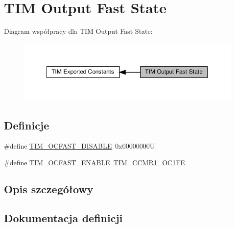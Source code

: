\hypertarget{group___t_i_m___output___fast___state}{}\section{T\+IM Output Fast State}
\label{group___t_i_m___output___fast___state}
Diagram współpracy dla T\+IM Output Fast State\+:\nopagebreak
\begin{figure}[H]
\begin{center}
\leavevmode
\includegraphics[width=350pt]{group___t_i_m___output___fast___state}
\end{center}
\end{figure}
\subsection*{Definicje}
\begin{DoxyCompactItemize}
\item 
\#define \hyperlink{group___t_i_m___output___fast___state_ga71429b63f2a6604171ccfd3a91ccf43a}{T\+I\+M\+\_\+\+O\+C\+F\+A\+S\+T\+\_\+\+D\+I\+S\+A\+B\+LE}~0x00000000U
\item 
\#define \hyperlink{group___t_i_m___output___fast___state_ga445a2c0633ac649e816cf7a16b716d61}{T\+I\+M\+\_\+\+O\+C\+F\+A\+S\+T\+\_\+\+E\+N\+A\+B\+LE}~\hyperlink{group___peripheral___registers___bits___definition_gab9c5878e85ce02c22d8a374deebd1b6e}{T\+I\+M\+\_\+\+C\+C\+M\+R1\+\_\+\+O\+C1\+FE}
\end{DoxyCompactItemize}


\subsection{Opis szczegółowy}


\subsection{Dokumentacja definicji}
\mbox{\label{group___t_i_m___output___fast___state_ga71429b63f2a6604171ccfd3a91ccf43a}} 
